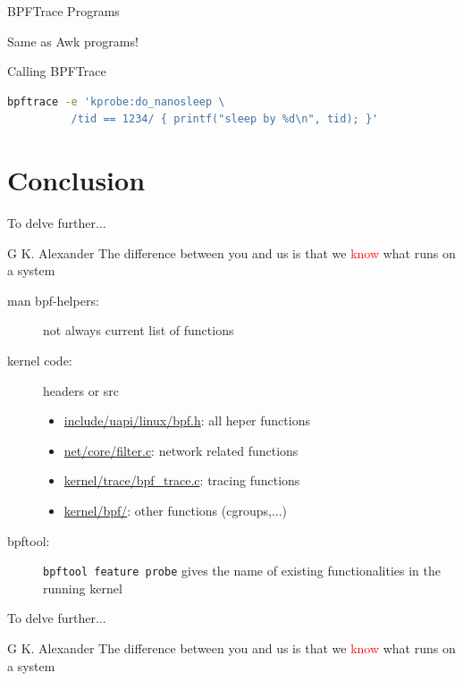 \begin{reveals}
\begin{frame}[c,fragile]{BPFTrace Programs}
  \vfill

  \begin{center}
    Same as Awk programs!
  \end{center}


  \begin{block}{Calling BPFTrace}
\begin{lstlisting}[language=bash]
 bpftrace -e 'kprobe:do_nanosleep \
          /tid == 1234/ { printf("sleep by %d\n", tid); }'   
\end{lstlisting}
  \end{block}



\end{frame}


\section{Conclusion}

\begin{frame}[c]{To delve further\(\ldots\)}
  
  \begin{block}{G K. Alexander}
    The difference between you and us is that we \textcolor{red}{know} what runs on a system
  \end{block}

  

  \begin{description}
  \item[man bpf-helpers:] not always current list of functions
  \item[kernel code:] headers or src
    \begin{itemize}
    \item \url{include/uapi/linux/bpf.h}: all heper functions
    \item \url{net/core/filter.c}: network related functions
    \item \url{kernel/trace/bpf_trace.c}: tracing functions
    \item \url{kernel/bpf/}: other functions (cgroups,...)
    \end{itemize}
  \item[bpftool:] \lstinline[language=bash]|bpftool feature probe|
    gives the name of existing functionalities in the running kernel
  \end{description}
\end{frame}


\begin{frame}[c]{To delve further\(\ldots\)}
  
  \begin{block}{G K. Alexander}
    The difference between you and us is that we \textcolor{red}{know} what runs on a system
  \end{block}


\end{frame}
\end{reveals}




